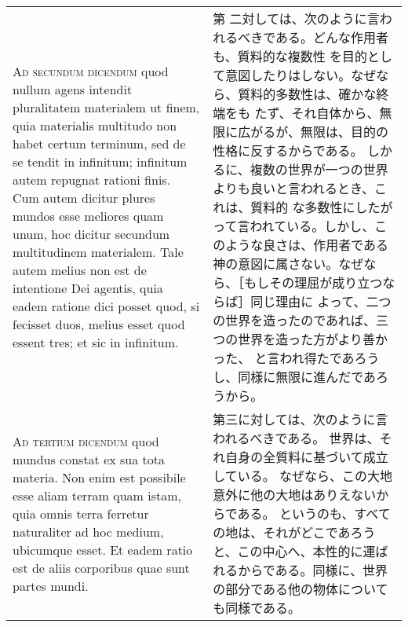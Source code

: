 \documentclass[10pt]{jsarticle} %
\begin{document}
\begin{longtable}{p{21em}p{21em}}
\\


{\scshape Ad secundum dicendum} quod nullum agens intendit pluralitatem
materialem ut finem, quia materialis multitudo non habet certum
terminum, sed de se tendit in infinitum; infinitum autem repugnat
rationi finis. Cum autem dicitur plures mundos esse meliores quam unum,
hoc dicitur secundum multitudinem materialem. Tale autem melius non est
de intentione Dei agentis, quia eadem ratione dici posset quod, si
fecisset duos, melius esset quod essent tres; et sic in infinitum.  & 第
二対しては、次のように言われるべきである。どんな作用者も、質料的な複数性
を目的として意図したりはしない。なぜなら、質料的多数性は、確かな終端をも
たず、それ自体から、無限に広がるが、無限は、目的の性格に反するからである。
しかるに、複数の世界が一つの世界よりも良いと言われるとき、これは、質料的
な多数性にしたがって言われている。しかし、このような良さは、作用者である
神の意図に属さない。なぜなら、［もしその理屈が成り立つならば］同じ理由に
よって、二つの世界を造ったのであれば、三つの世界を造った方がより善かった、
と言われ得たであろうし、同様に無限に進んだであろうから。

\\


{\scshape Ad tertium dicendum} quod mundus constat ex
sua tota materia. Non enim est possibile esse aliam terram quam istam,
quia omnis terra ferretur naturaliter ad hoc medium, ubicumque esset. Et
eadem ratio est de aliis corporibus quae sunt partes mundi.
&
第三に対しては、次のように言われるべきである。
世界は、それ自身の全質料に基づいて成立している。
なぜなら、この大地意外に他の大地はありえないからである。
というのも、すべての地は、それがどこであろうと、この中心へ、本性的に運ば
 れるからである。同様に、世界の部分である他の物体についても同様である。



\end{longtable}
\end{document}
